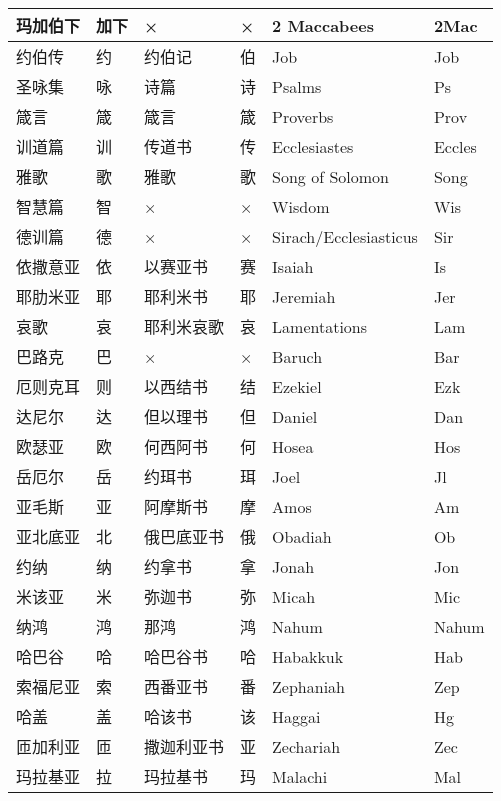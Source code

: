\begin{longtable}{|l|l|l|l|l|l|}
	\hline
	玛加伯下 & 加下 & × & × & 2 Maccabees & 2Mac \\
	\hline
	约伯传 & 约 & 约伯记 & 伯 & Job & Job \\
	\hline
	圣咏集 & 咏 & 诗篇 & 诗 & Psalms & Ps \\
	\hline
	箴言 & 箴 & 箴言 & 箴 & Proverbs & Prov \\
	\hline
	训道篇 & 训 & 传道书 & 传 & Ecclesiastes & Eccles \\
	\hline
	雅歌 & 歌 & 雅歌 & 歌 & Song of Solomon & Song \\
	\hline
	智慧篇 & 智 & × & × & Wisdom & Wis \\
	\hline
	德训篇 & 德 & × & × & Sirach/Ecclesiasticus & Sir \\
	\hline
	依撒意亚 & 依 & 以赛亚书 & 赛 & Isaiah & Is \\
	\hline
	耶肋米亚 & 耶 & 耶利米书 & 耶 & Jeremiah & Jer \\
	\hline
	哀歌 & 哀 & 耶利米哀歌 & 哀 & Lamentations & Lam \\
	\hline
	巴路克 & 巴 & × & × & Baruch & Bar \\
	\hline
	厄则克耳 & 则 & 以西结书 & 结 & Ezekiel & Ezk \\
	\hline
	达尼尔 & 达 & 但以理书 & 但 & Daniel & Dan \\
	\hline
	欧瑟亚 & 欧 & 何西阿书 & 何 & Hosea & Hos \\
	\hline
	岳厄尔 & 岳 & 约珥书 & 珥 & Joel & Jl \\
	\hline
	亚毛斯 & 亚 & 阿摩斯书 & 摩 & Amos & Am \\
	\hline
	亚北底亚 & 北 & 俄巴底亚书 & 俄 & Obadiah & Ob \\
	\hline
	约纳 & 纳 & 约拿书 & 拿 & Jonah & Jon \\
	\hline
	米该亚 & 米 & 弥迦书 & 弥 & Micah & Mic \\
	\hline
	纳鸿 & 鸿 & 那鸿 & 鸿 & Nahum & Nahum \\
	\hline
	哈巴谷 & 哈 & 哈巴谷书 & 哈 & Habakkuk & Hab \\
	\hline
	索福尼亚 & 索 & 西番亚书 & 番 & Zephaniah & Zep \\
	\hline
	哈盖 & 盖 & 哈该书 & 该 & Haggai & Hg \\
	\hline
	匝加利亚 & 匝 & 撒迦利亚书 & 亚 & Zechariah & Zec \\
	\hline
	玛拉基亚 & 拉 & 玛拉基书 & 玛 & Malachi & Mal \\
	\hline
\end{longtable} 

\newpage

